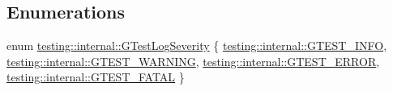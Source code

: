 \subsection*{Enumerations}
\begin{DoxyCompactItemize}
\item 
enum \hyperlink{namespacetesting_1_1internal_aa6255ef3b023c5b4e1a2198d887fb977}{testing\+::internal\+::\+G\+Test\+Log\+Severity} \{ \hyperlink{namespacetesting_1_1internal_aa6255ef3b023c5b4e1a2198d887fb977aff315e0913fcda86fe4de882bf5e33e9}{testing\+::internal\+::\+G\+T\+E\+S\+T\+\_\+\+I\+N\+FO}, 
\hyperlink{namespacetesting_1_1internal_aa6255ef3b023c5b4e1a2198d887fb977a7a051bc2794f15a4bf0eab40562a304c}{testing\+::internal\+::\+G\+T\+E\+S\+T\+\_\+\+W\+A\+R\+N\+I\+NG}, 
\hyperlink{namespacetesting_1_1internal_aa6255ef3b023c5b4e1a2198d887fb977a651e9cd2a904e0c8210536271b875f75}{testing\+::internal\+::\+G\+T\+E\+S\+T\+\_\+\+E\+R\+R\+OR}, 
\hyperlink{namespacetesting_1_1internal_aa6255ef3b023c5b4e1a2198d887fb977a75063567740f6bf7da419b1b9197b12e}{testing\+::internal\+::\+G\+T\+E\+S\+T\+\_\+\+F\+A\+T\+AL}
 \}
\end{DoxyCompactItemize}
